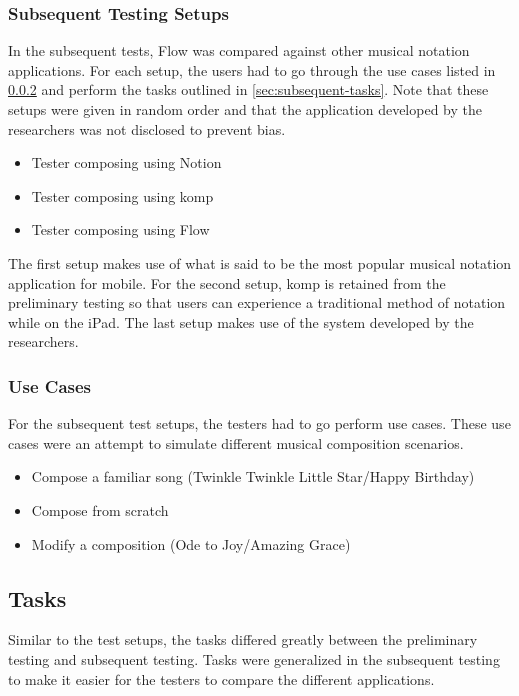 			\subsubsection{Subsequent Testing Setups}

				In the subsequent tests, Flow was compared against other musical notation applications. For each setup, the users had to go through the use cases listed in \ref{sec:use-cases} and perform the tasks outlined in \ref{sec:subsequent-tasks}. Note that these setups were given in random order and that the application developed by the researchers was not disclosed to prevent bias.

				\begin{itemize}
					\item Tester composing using Notion
					\item Tester composing using komp
					\item Tester composing using Flow
				\end{itemize}

				The first setup makes use of what is said to be the most popular musical notation application for mobile. For the second setup, komp is retained from the preliminary testing so that users can experience a traditional method of notation while on the iPad. The last setup makes use of the system developed by the researchers.

			\subsubsection{Use Cases}
			\label{sec:use-cases}

				For the subsequent test setups, the testers had to go perform use cases. These use cases were an attempt to simulate different musical composition scenarios. 

				\begin{itemize}
				    \item Compose a familiar song (Twinkle Twinkle Little Star/Happy Birthday)
				    \item Compose from scratch
				    \item Modify a composition (Ode to Joy/Amazing Grace)
				\end{itemize}

		\subsection{Tasks}
		\label{sec:tasks}

			Similar to the test setups, the tasks differed greatly between the preliminary testing and subsequent testing. Tasks were generalized in the subsequent testing to make it easier for the testers to compare the different applications.

